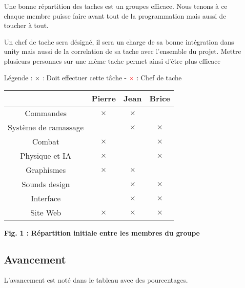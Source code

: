 \documentclass{article}
\begin{document}
\par
Une bonne répartition des taches est un groupes efficace. Nous tenons à ce chaque membre puisse faire avant tout de la programmation mais aussi de toucher à tout. 
\newline

\par
Un chef de tache sera désigné, il sera un charge de sa bonne intégration dans unity mais aussi de la correlation de sa tache avec l'ensemble du projet. Mettre plusieurs personnes sur une même tache permet ainsi d'être plus efficace
\newline

\par
Légende : $\times$ : Doit effectuer cette tâche   - \textcolor{red}{ $\times$ }: Chef de tache 

\begin{center}
\begin{tabular}{|c|c|c|c|}
\hline
 & Pierre & Jean & Brice \\
\hline

Commandes & $\times$ & $\times$&   \\
\hline
Système de ramassage &  & $\times$& $\times$  \\
\hline
Combat& $\times$ & & $\times$  \\
\hline
 Physique et IA & $\times$ & & $\times$  \\
 
\hline
Graphismes & $\times$ & $\times$ & \\

\hline
Sounds design &  & $\times$ & $\times$ \\
\hline
Interface & & $\times$ & $\times$ \\
\hline
Site Web &$\times$ &$\times$ &$\times$ \\
\hline
\end{tabular}
\end{center}

\begin{center}
\bf{Fig. 1 : Répartition initiale entre les membres du groupe}
\end{center}



\newpage
\subsection{Avancement}

\par
L'avancement est noté dans le tableau avec des pourcentages.
\newline
\end{document}
